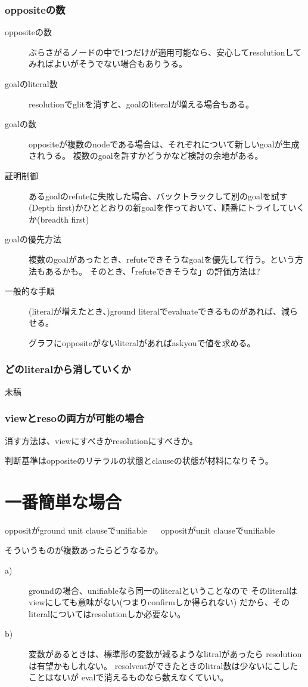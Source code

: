 \documentclass[10pt, onecolumn]{jarticle}   	%
\begin{document}
\subsubsection{oppositeの数}
\begin{description}
\item[ oppositeの数] ぶらさがるノードの中で1つだけが適用可能なら、安心してresolutionしてみればよいがそうでない場合もありうる。
\item[ goalのliteral数] resolutionでglitを消すと、goalのliteralが増える場合もある。
\item[ goalの数] oppositeが複数のnodeである場合は、それぞれについて新しいgoalが生成されうる。
複数のgoalを許すかどうかなど検討の余地がある。
\item[ 証明制御 ]あるgoalのrefuteに失敗した場合、バックトラックして別のgoalを試す(Depth first)かひととおりの新goalを作っておいて、順番にトライしていくか(breadth first)
\item[ goalの優先方法]複数のgoalがあったとき、refuteできそうなgoalを優先して行う。という方法もあるかも。
そのとき、「refuteできそうな」の評価方法は?
\item[一般的な手順]
(literalが増えたとき、)ground literalでevaluateできるものがあれば、減らせる。

グラフにoppositeがないliteralがあればaskyouで値を求める。
\end{description}

\subsubsection{どのliteralから消していくか}
未稿
\subsubsection{viewとresoの両方が可能の場合}
消す方法は、viewにすべきかresolutionにすべきか。

判断基準はoppositeのリテラルの状態とclauseの状態が材料になりそう。

\section{一番簡単な場合}

oppositがground unit clauseでunifiable
　
oppositがunit clauseでunifiable


そういうものが複数あったらどうなるか。
\begin{description}
\item[ a)]groundの場合、unifiableなら同一のliteralということなので
そのliteralはviewにしても意味がない(つまりconfirmしか得られない)
だから、そのliteralについてはresolutionしか必要ない。
\item[ b)] 変数があるときは、標準形の変数が減るようなlitralがあったら
resolutionは有望かもしれない。
resolventができたときのlitral数は少ないにこしたことはないが
evalで消えるものなら数えなくていい。
\end{description}
\end{document}
